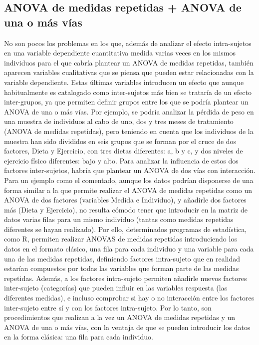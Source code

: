 \subsection{ANOVA de medidas repetidas + ANOVA de una o más vías}
No son pocos los problemas en los que, además de analizar el efecto intra-sujetos en una variable dependiente
cuantitativa medida varias veces en los mismos individuos para el que cabría plantear un ANOVA de medidas repetidas,
también aparecen variables cualitativas que se piensa que pueden estar relacionadas con la variable dependiente. Estas
últimas variables introducen un efecto que aunque habitualmente es catalogado como inter-sujetos más bien se trataría de
un efecto inter-grupos, ya que permiten definir grupos entre los que se podría plantear un ANOVA de una o más vías. Por
ejemplo, se podría analizar la pérdida de peso en una muestra de individuos al cabo de uno, dos y tres meses de
tratamiento (ANOVA de medidas repetidas), pero teniendo en cuenta que los individuos de la muestra han sido divididos en
seis grupos que se forman por el cruce de dos factores, Dieta y Ejercicio, con tres dietas diferentes: a, b y c, y dos
niveles de ejercicio físico diferentes: bajo y alto. Para analizar la influencia de estos dos factores inter-sujetos,
habría que plantear un ANOVA de dos vías con interacción. Para un ejemplo como el comentado, aunque los datos podrían
disponerse de una forma similar a la que permite realizar el ANOVA de medidas repetidas como un ANOVA de dos factores
(variables Medida e Individuo), y añadirle dos factores más (Dieta y Ejercicio), no resulta cómodo tener que introducir
en la matriz de datos varias filas para un mismo individuo (tantas como medidas repetidas diferentes se hayan
realizado). Por ello, determinados programas de estadística, como R, permiten realizar ANOVAS de medidas repetidas
introduciendo los datos en el formato clásico, una fila para cada individuo y una variable para cada una de las medidas
repetidas, definiendo factores intra-sujeto que en realidad estarían compuestos por todas las variables que forman parte
de las medidas repetidas. Además, a los factores intra-sujeto permiten añadirle nuevos factores inter-sujeto
(categorías) que pueden influir en las variables respuesta (las diferentes medidas), e incluso comprobar si hay o no
interacción entre los factores inter-sujeto entre sí y con los factores intra-sujeto. Por lo tanto, son procedimientos
que realizan a la vez un ANOVA de medidas repetidas y un ANOVA de una o más vías, con la ventaja de que se pueden
introducir los datos en la forma clásica: una fila para cada individuo.


